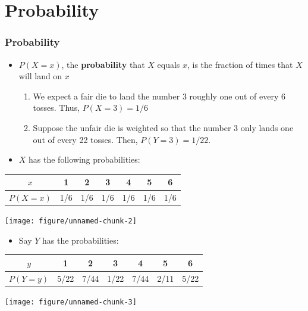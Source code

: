 \documentclass[handout]{beamer}\usepackage{graphicx, color}
\newenvironment{knitrout}{}{} %
\providecommand{\q}{$\quad$ \newline}
\numberwithin{equation}{section}
\begin{document}
\section{Probability}

\begin{frame}
\frametitle{Probability}
\begin{itemize}
\pause \item $P(X = x)$, the {\bf probability} that $X$ equals $x$, is the fraction of times that $X$ will land on $x$
\begin{enumerate}[1. ]
\pause \item We expect a fair die to land the number 3 roughly one out of every 6 tosses. Thus, $P(X = 3) = 1/6$
\pause \item Suppose the unfair die is weighted so that the number 3 only lands one out of every 22 tosses. Then, $P(Y = 3) = 1/22$. 
\end{enumerate}
\end{itemize}
\end{frame}


\begin{frame}

\begin{itemize}
\item $X$ has the following probabilities: \q 
\end{itemize}
\begin{tabular}{ccccccc}
$x$ & 1 & 2 & 3 & 4 & 5 & 6 \\ \hline
$P(X = x)$ & 1/6 & 1/6 & 1/6 & 1/6 & 1/6 & 1/6 
\end{tabular} 

\begin{center}
\begin{knitrout}
\color{fgcolor}
\texttt{[image: figure/unnamed-chunk-2]} 

\end{knitrout}

\end{center}


\end{frame}

\begin{frame}
\begin{itemize}
\item Say $Y$ has the probabilities: \q 
\end{itemize}
\begin{tabular}{ccccccc}
$y$ & 1 & 2 & 3 & 4 & 5 & 6 \\ \hline
$P(Y = y)$ & 5/22 & 7/44 & 1/22 & 7/44 & 2/11 & 5/22
\end{tabular} 

\begin{center}
\begin{knitrout}
\color{fgcolor}
\texttt{[image: figure/unnamed-chunk-3]} 

\end{knitrout}

\end{center}

\end{frame}
\end{document}
